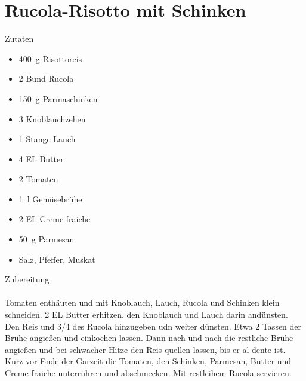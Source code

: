 \section*{Rucola-Risotto mit Schinken}
\ihead{}\ohead{}
\cfoot{}
{\Large Zutaten}
\begin{multicols}{2}
\begin{itemize}
    \item \SI{400}{g} Risottoreis
    \item \num{2} Bund Rucola
    \item \SI{150}{g} Parmaschinken
    \item \num{3} Knoblauchzehen
    \item \num{1} Stange Lauch
    \item \num{4} EL Butter
    \item \num{2} Tomaten
    \item \SI{1}{l} Gemüsebrühe
    \item \num{2} EL Creme fraiche
    \item \SI{50}{g} Parmesan
    \item Salz, Pfeffer, Muskat
\end{itemize}
\end{multicols}
\noindent
{\Large Zubereitung}\\
\\
Tomaten enthäuten und mit Knoblauch, Lauch, Rucola und Schinken klein schneiden.
\num{2} EL Butter erhitzen, den Knoblauch und Lauch darin andünsten.
Den Reis und \num{3/4} des Rucola hinzugeben udn weiter dünsten.
Etwa \num{2} Tassen der Brühe angießen und einkochen lassen. 
Dann nach und nach die restliche Brühe angießen und bei schwacher Hitze den Reis quellen lassen, bis er al dente ist.
Kurz vor Ende der Garzeit die Tomaten, den Schinken, Parmesan, Butter und Creme fraiche unterrühren und abschmecken. Mit restlcihem Rucola servieren.